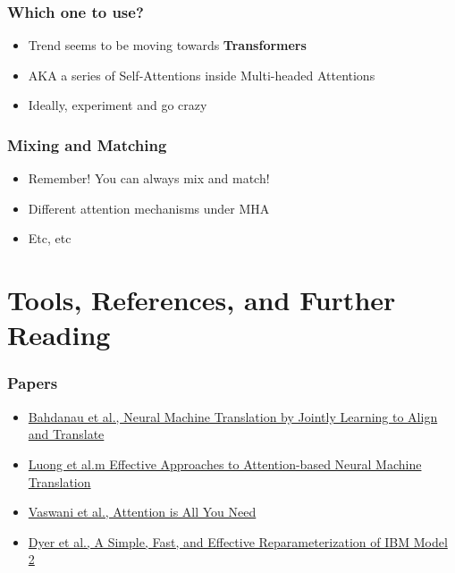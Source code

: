 \documentclass[usenames,dvipsnames]{beamer}
\begin{document}
\begin{frame}
\frametitle{Which one to use?}
\begin{itemize}
  \item Trend seems to be moving towards \textbf{Transformers}
  \item AKA a series of Self-Attentions inside Multi-headed Attentions
  \item Ideally, experiment and go crazy
\end{itemize}
\end{frame}

\begin{frame}
\frametitle{Mixing and Matching}
  \begin{itemize}
    \item Remember! You can always mix and match!
    \item Different attention mechanisms under MHA
    \item Etc, etc
  \end{itemize}
\end{frame}


\section{Tools, References, and Further Reading}


\begin{frame}
\frametitle{Papers}
  \begin{itemize}
    \item \href{https://arxiv.org/pdf/1409.0473}{Bahdanau et al., Neural Machine Translation by Jointly Learning to Align and Translate}
    \item \href{https://arxiv.org/pdf/1508.04025}{Luong et al.m Effective Approaches to Attention-based Neural Machine Translation}
    \item \href{https://papers.nips.cc/paper/7181-attention-is-all-you-need.pdf}{Vaswani et al., Attention is All You Need}
    \item \href{http://www.aclweb.org/anthology/N13-1073}{Dyer et al., A Simple, Fast, and Effective Reparameterization of IBM Model 2}
  \end{itemize}
\end{frame}


\end{document}
